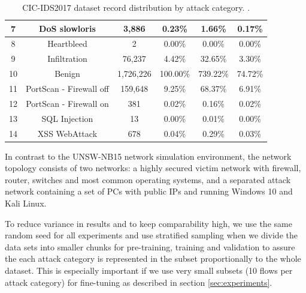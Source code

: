 \begin{table}[H]
{\begin{tabular}{cccccc}
		7  & DoS slowloris           & 3,886        & 0.23\%                 & 1.66\%                          & 0.17\%                    \\ \midrule
		8  & Heartbleed              & 2           & 0.00\%                 & 0.00\%                          & 0.00\%                    \\ \midrule
		9  & Infiltration            & 76,237       & 4.42\%                 & 32.65\%                         & 3.30\%                    \\ \midrule
		10 & Benign                  & 1,726,226     & 100.00\%               & 739.22\%                        & 74.72\%                   \\ \midrule
		11 & PortScan - Firewall off & 159,648      & 9.25\%                 & 68.37\%                         & 6.91\%                    \\ \midrule
		12 & PortScan - Firewall on  & 381         & 0.02\%                 & 0.16\%                          & 0.02\%                    \\ \midrule
		13 & SQL Injection           & 13          & 0.00\%                 & 0.01\%                          & 0.00\%                    \\ \midrule
		14 & XSS WebAttack           & 678         & 0.04\%                 & 0.29\%                          & 0.03\%                   
	\end{tabular}}
	\caption{CIC-IDS2017 dataset record distribution by attack category. \cite{cic_ids_2017_analysis}.}
	\label{table:methodology:datasets:cic_ids_2017_categories}
\end{table}

In contrast to the UNSW-NB15 network simulation environment, the network topology consists of two networks: a highly secured victim network with firewall, router, switches and most common operating systems, and a separated attack network containing a set of PCs with public IPs and running Windows 10 and Kali Linux.

To reduce variance in results and to keep comparability high, we use the same random seed for all experiments and use stratified sampling when we divide the data sets into smaller chunks for pre-training, training and validation to assure the each attack category is represented in the subset proportionally to the whole dataset. This is especially important if we use very small subsets (10 flows per attack category) for fine-tuning as described in section \ref{sec:experiments}. 

